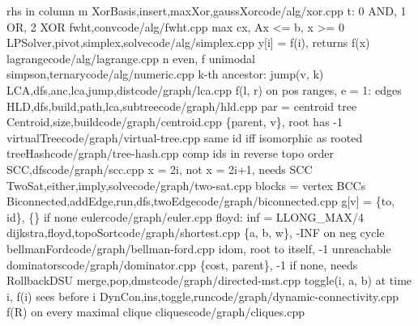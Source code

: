   {rhs in column m}
  {XorBasis,insert,maxXor,gaussXor}{code/alg/xor.cpp}
  {t: 0 AND, 1 OR, 2 XOR}
  {fwht,conv}{code/alg/fwht.cpp}
  {max cx, Ax <= b, x >= 0}
  {LPSolver,pivot,simplex,solve}{code/alg/simplex.cpp}
  {y[i] = f(i), returns f(x)}
  {lagrange}{code/alg/lagrange.cpp}
  {n even, f unimodal}
  {simpson,ternary}{code/alg/numeric.cpp}
  {k-th ancestor: jump(v, k)}
  {LCA,dfs,anc,lca,jump,dist}{code/graph/lca.cpp}
  {f(l, r) on pos ranges, e = 1: edges}
  {HLD,dfs,build,path,lca,subtree}{code/graph/hld.cpp}
  {par = centroid tree}
  {Centroid,size,build}{code/graph/centroid.cpp}
  {\{parent, v\}, root has -1}
  {virtualTree}{code/graph/virtual-tree.cpp}
  {same id iff isomorphic as rooted}
  {treeHash}{code/graph/tree-hash.cpp}
  {comp ids in reverse topo order}
  {SCC,dfs}{code/graph/scc.cpp}
  {x = 2i, not x = 2i+1, needs SCC}
  {TwoSat,either,imply,solve}{code/graph/two-sat.cpp}
  {blocks = vertex BCCs}
  {Biconnected,addEdge,run,dfs,twoEdge}{code/graph/biconnected.cpp}
  {g[v] = \{to, id\}, \{\} if none}
  {euler}{code/graph/euler.cpp}
  {floyd: inf = LLONG\_MAX/4}
  {dijkstra,floyd,topoSort}{code/graph/shortest.cpp}
  {\{a, b, w\}, -INF on neg cycle}
  {bellmanFord}{code/graph/bellman-ford.cpp}
  {idom, root to itself, -1 unreachable}
  {dominators}{code/graph/dominator.cpp}
  {\{cost, parent\}, -1 if none, needs RollbackDSU}
  {merge,pop,dmst}{code/graph/directed-mst.cpp}
  {toggle(i, a, b) at time i, f(i) sees before i}
  {DynCon,ins,toggle,run}{code/graph/dynamic-connectivity.cpp}
  {f(R) on every maximal clique}
  {cliques}{code/graph/cliques.cpp}
